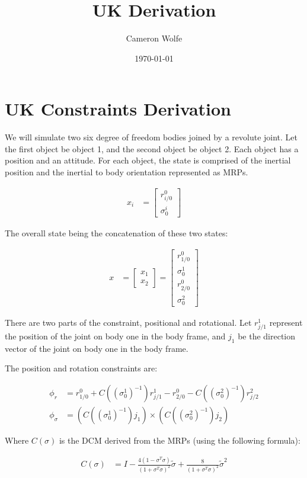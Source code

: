 \documentclass{article}
\title{UK Derivation}
\author{Cameron Wolfe}
\date{\today}
\begin{document}
\section{UK Constraints Derivation}

We will simulate two six degree of freedom bodies joined by a
revolute joint.  Let the first object be object 1, and the second
object be object 2.  Each object has a position and an attitude.  For
each object, the state is comprised of the inertial position and the
inertial to body orientation represented as MRPs.

\begin{align}
    x_i &=
    \begin{bmatrix}
        r_{i/0}^0 \\
        \sigma_0^i
    \end{bmatrix}
\end{align}

The overall state being the concatenation of these two states:

\begin{align}
    x &=
    \begin{bmatrix}
        x_1 \\
        x_2
    \end{bmatrix} =
    \begin{bmatrix}
        r_{1/0}^0 \\
        \sigma_0^1 \\
        r_{2/0}^0 \\
        \sigma_0^2
    \end{bmatrix}
\end{align}

There are two parts of the constraint, positional and rotational.
Let $r_{j/1}^1$ represent the position of the joint on body one in
the body frame, and $j_1$ be the direction vector of the joint
on body one in the body frame.

The position and rotation constraints are:

\begin{align}
    \phi_r &= r_{1/0}^0 + C((\sigma_0^1)^{-1})r_{j/1}^1 - r_{2/0}^0 -
    C((\sigma_0^2)^{-1})r_{j/2}^2 \\
    \phi_\sigma &=
    (C((\sigma_0^1)^{-1})j_1)\times(C((\sigma_0^2)^{-1})j_2)
\end{align}

Where $C(\sigma)$ is the DCM derived from the MRPs (using the
following formula):

\begin{align}
    C(\sigma) &= I -
    \frac{4(1-\sigma^T\sigma)}{(1+\sigma^T\sigma)^2}\tilde{\sigma} +
    \frac{8}{(1+\sigma^T\sigma)^2}\tilde{\sigma}^2
\end{align}
\end{document}
